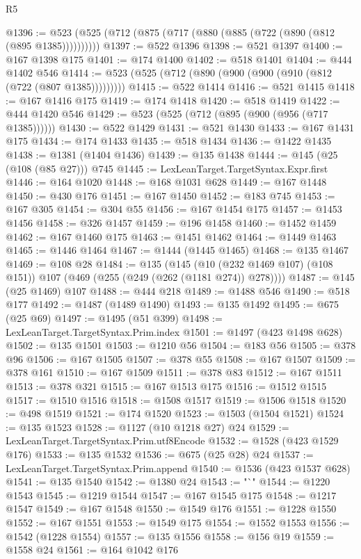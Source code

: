 \begin{lexlean}{R5}
\begin{coremodule}
@1396 := @523 (@525 (@712 (@875 (@717 (@880 (@885 (@722 (@890 (@812 (@895 @1385))))))))))
@1397 := @522 @1396
@1398 := @521 @1397
@1400 := @167 @1398 @175
@1401 := @174 @1400
@1402 := @518 @1401
@1404 := @444 @1402 @546
@1414 := @523 (@525 (@712 (@890 (@900 (@900 (@910 (@812 (@722 (@807 @1385)))))))))
@1415 := @522 @1414
@1416 := @521 @1415
@1418 := @167 @1416 @175
@1419 := @174 @1418
@1420 := @518 @1419
@1422 := @444 @1420 @546
@1429 := @523 (@525 (@712 (@895 (@900 (@956 (@717 @1385))))))
@1430 := @522 @1429
@1431 := @521 @1430
@1433 := @167 @1431 @175
@1434 := @174 @1433
@1435 := @518 @1434
@1436 := @1422 @1435
@1438 := @1381 (@1404 @1436)
@1439 := @135 @1438
@1444 := @145 (@25 (@108 (@85 @27))) @745
@1445 := LexLeanTarget.TargetSyntax.Expr.first
@1446 := @164 @1020
@1448 := @168 @1031 @628
@1449 := @167 @1448
@1450 := @430 @176
@1451 := @167 @1450
@1452 := @183 @745
@1453 := @167 @305
@1454 := @304 @55
@1456 := @167 @1454 @175
@1457 := @1453 @1456
@1458 := @326 @1457
@1459 := @196 @1458
@1460 := @1452 @1459
@1462 := @167 @1460 @175
@1463 := @1451 @1462
@1464 := @1449 @1463
@1465 := @1446 @1464
@1467 := @1444 (@1445 @1465)
@1468 := @135 @1467
@1469 := @108 @28
@1484 := @135
    (@145 (@10 (@232 @1469 @107) (@108 @151)) @107 (@469 (@255 (@249 (@262 (@1181 @274)) @278))))
@1487 := @145 (@25 @1469) @107
@1488 := @444 @218
@1489 := @1488 @546
@1490 := @518 @177
@1492 := @1487 (@1489 @1490)
@1493 := @135 @1492
@1495 := @675 (@25 @69)
@1497 := @1495 (@51 @399)
@1498 := LexLeanTarget.TargetSyntax.Prim.index
@1501 := @1497 (@423 @1498 @628)
@1502 := @135 @1501
@1503 := @1210 @56
@1504 := @183 @56
@1505 := @378 @96
@1506 := @167 @1505
@1507 := @378 @55
@1508 := @167 @1507
@1509 := @378 @161
@1510 := @167 @1509
@1511 := @378 @83
@1512 := @167 @1511
@1513 := @378 @321
@1515 := @167 @1513 @175
@1516 := @1512 @1515
@1517 := @1510 @1516
@1518 := @1508 @1517
@1519 := @1506 @1518
@1520 := @498 @1519
@1521 := @174 @1520
@1523 := @1503 (@1504 @1521)
@1524 := @135 @1523
@1528 := @1127 (@10 @1218 @27) @24
@1529 := LexLeanTarget.TargetSyntax.Prim.utf8Encode
@1532 := @1528 (@423 @1529 @176)
@1533 := @135 @1532
@1536 := @675 (@25 @28) @24
@1537 := LexLeanTarget.TargetSyntax.Prim.append
@1540 := @1536 (@423 @1537 @628)
@1541 := @135 @1540
@1542 := @1380 @24
@1543 := "`"
@1544 := @1220 @1543
@1545 := @1219 @1544
@1547 := @167 @1545 @175
@1548 := @1217 @1547
@1549 := @167 @1548
@1550 := @1549 @176
@1551 := @1228 @1550
@1552 := @167 @1551
@1553 := @1549 @175
@1554 := @1552 @1553
@1556 := @1542 (@1228 @1554)
@1557 := @135 @1556
@1558 := @156 @19
@1559 := @1558 @24
@1561 := @164 @1042 @176

\end{coremodule}
\end{lexlean}
